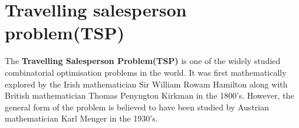 \documentclass[a4paper]{article}
\begin{document}
%
%

\section{Travelling salesperson problem(TSP)}
The \textbf{Travelling Salesperson Problem(TSP)} is one of the widely studied combinatorial optimisation problems in the world. It was first mathematically explored by the Irish mathematician Sir William Rowam Hamilton along with British mathematician Thomas Penyngton Kirkman in the 1800's. However, the general form of the problem is believed to have been studied by Austrian mathematician Karl Menger in the 1930's.
\end{document}
